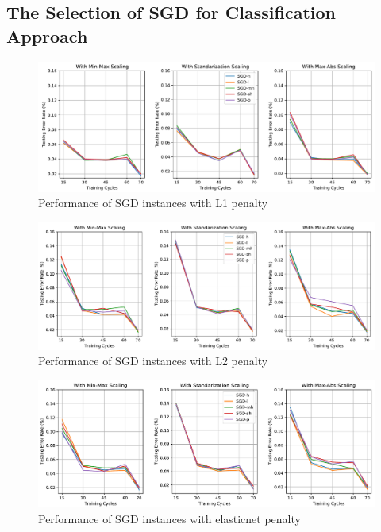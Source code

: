 \documentclass[a4paper,12pt]{article}
\begin{document}
\subsection{The Selection of SGD for Classification Approach} \label{SGDClassifiersTests}
\begin{figure}[H]
	\centering
	\includegraphics[keepaspectratio, width=\linewidth]{graphs/SGDClassifiersWithPenaltyL1.pdf}
	\caption{Performance of SGD instances with L1 penalty}
	\label{SGDCL1}
\end{figure}
\begin{figure}[H]
	\centering
	\includegraphics[keepaspectratio, width=\linewidth]{graphs/SGDClassifiersWithPenaltyL2.pdf}
	\caption{Performance of SGD instances with L2 penalty}
	\label{SGDCL2}
\end{figure}
\begin{figure}[H]
	\centering
	\includegraphics[keepaspectratio, width=\linewidth]{graphs/SGDClassifiersWithPenaltyElasticnet.pdf}
	\caption{Performance of SGD instances with elasticnet penalty}
	\label{SGDCElasticnet}
\end{figure}
\end{document}
